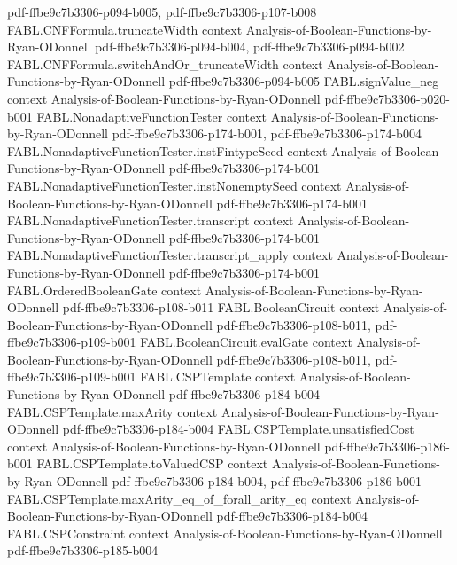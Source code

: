 \begin{theorem}
{    pdf-ffbe9c7b3306-p094-b005,
    pdf-ffbe9c7b3306-p107-b008}
\proofstep
  {FABL.CNFFormula.truncateWidth}
  {context}
  {Analysis-of-Boolean-Functions-by-Ryan-ODonnell}
  {pdf-ffbe9c7b3306-p094-b004,
    pdf-ffbe9c7b3306-p094-b002}
\proofstep
  {FABL.CNFFormula.switchAndOr_truncateWidth}
  {context}
  {Analysis-of-Boolean-Functions-by-Ryan-ODonnell}
  {pdf-ffbe9c7b3306-p094-b005}
\proofstep
  {FABL.signValue_neg}
  {context}
  {Analysis-of-Boolean-Functions-by-Ryan-ODonnell}
  {pdf-ffbe9c7b3306-p020-b001}
\proofstep
  {FABL.NonadaptiveFunctionTester}
  {context}
  {Analysis-of-Boolean-Functions-by-Ryan-ODonnell}
  {pdf-ffbe9c7b3306-p174-b001,
    pdf-ffbe9c7b3306-p174-b004}
\proofstep
  {FABL.NonadaptiveFunctionTester.instFintypeSeed}
  {context}
  {Analysis-of-Boolean-Functions-by-Ryan-ODonnell}
  {pdf-ffbe9c7b3306-p174-b001}
\proofstep
  {FABL.NonadaptiveFunctionTester.instNonemptySeed}
  {context}
  {Analysis-of-Boolean-Functions-by-Ryan-ODonnell}
  {pdf-ffbe9c7b3306-p174-b001}
\proofstep
  {FABL.NonadaptiveFunctionTester.transcript}
  {context}
  {Analysis-of-Boolean-Functions-by-Ryan-ODonnell}
  {pdf-ffbe9c7b3306-p174-b001}
\proofstep
  {FABL.NonadaptiveFunctionTester.transcript_apply}
  {context}
  {Analysis-of-Boolean-Functions-by-Ryan-ODonnell}
  {pdf-ffbe9c7b3306-p174-b001}
\proofstep
  {FABL.OrderedBooleanGate}
  {context}
  {Analysis-of-Boolean-Functions-by-Ryan-ODonnell}
  {pdf-ffbe9c7b3306-p108-b011}
\proofstep
  {FABL.BooleanCircuit}
  {context}
  {Analysis-of-Boolean-Functions-by-Ryan-ODonnell}
  {pdf-ffbe9c7b3306-p108-b011,
    pdf-ffbe9c7b3306-p109-b001}
\proofstep
  {FABL.BooleanCircuit.evalGate}
  {context}
  {Analysis-of-Boolean-Functions-by-Ryan-ODonnell}
  {pdf-ffbe9c7b3306-p108-b011,
    pdf-ffbe9c7b3306-p109-b001}
\proofstep
  {FABL.CSPTemplate}
  {context}
  {Analysis-of-Boolean-Functions-by-Ryan-ODonnell}
  {pdf-ffbe9c7b3306-p184-b004}
\proofstep
  {FABL.CSPTemplate.maxArity}
  {context}
  {Analysis-of-Boolean-Functions-by-Ryan-ODonnell}
  {pdf-ffbe9c7b3306-p184-b004}
\proofstep
  {FABL.CSPTemplate.unsatisfiedCost}
  {context}
  {Analysis-of-Boolean-Functions-by-Ryan-ODonnell}
  {pdf-ffbe9c7b3306-p186-b001}
\proofstep
  {FABL.CSPTemplate.toValuedCSP}
  {context}
  {Analysis-of-Boolean-Functions-by-Ryan-ODonnell}
  {pdf-ffbe9c7b3306-p184-b004,
    pdf-ffbe9c7b3306-p186-b001}
\proofstep
  {FABL.CSPTemplate.maxArity_eq_of_forall_arity_eq}
  {context}
  {Analysis-of-Boolean-Functions-by-Ryan-ODonnell}
  {pdf-ffbe9c7b3306-p184-b004}
\proofstep
  {FABL.CSPConstraint}
  {context}
  {Analysis-of-Boolean-Functions-by-Ryan-ODonnell}
  {pdf-ffbe9c7b3306-p185-b004}

\end{theorem}
